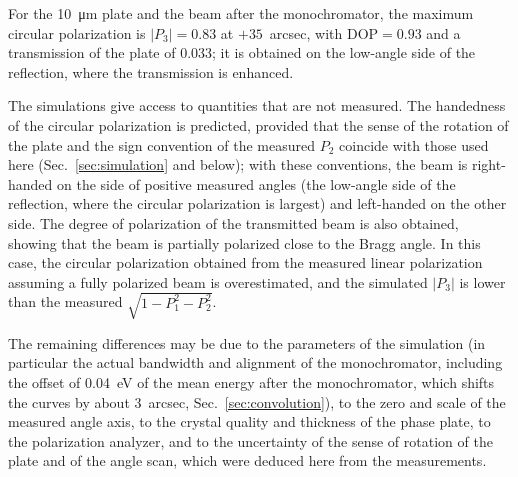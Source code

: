 \documentclass{iucr}
\begin{document}
For the \SI{10}{\micro\meter} plate and the beam after the monochromator, the maximum circular polarization is $|P_3|=0.83$ at $+35$~arcsec, with DOP$=0.93$ and a transmission of the plate of 0.033; it is obtained on the low-angle side of the reflection, where the transmission is enhanced.

The simulations give access to quantities that are not measured. The handedness of the circular polarization is predicted, provided that the sense of the rotation of the plate and the sign convention of the measured $P_2$ coincide with those used here (Sec.~\ref{sec:simulation} and below); with these conventions, the beam is right-handed on the side of positive measured angles (the low-angle side of the reflection, where the circular polarization is largest) and left-handed on the other side. The degree of polarization of the transmitted beam is also obtained, showing that the beam is partially polarized close to the Bragg angle. In this case, the circular polarization obtained from the measured linear polarization assuming a fully polarized beam is overestimated, and the simulated $|P_3|$ is lower than the measured $\sqrt{1-P_1^2-P_2^2}$.

The remaining differences may be due to the parameters of the simulation (in particular the actual bandwidth and alignment of the monochromator, including the offset of 0.04~eV of the mean energy after the monochromator, which shifts the curves by about 3~arcsec, Sec.~\ref{sec:convolution}), to the zero and scale of the measured angle axis, to the crystal quality and thickness of the phase plate, to the polarization analyzer, and to the uncertainty of the sense of rotation of the plate and of the angle scan, which were deduced here from the measurements.
\end{document}
